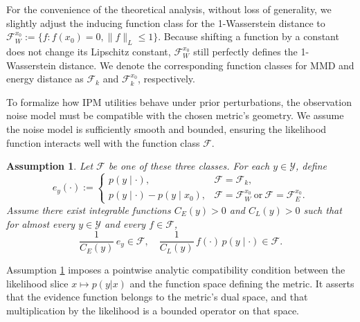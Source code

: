 \documentclass[twoside,11pt]{article}
\def\gF{{\mathcal{F}}}
\newtheorem{assumption}{Assumption}
\begin{document}
For the convenience of the theoretical analysis, without loss of generality, we slightly adjust the inducing function class for the 1-Wasserstein distance to $\gF_W^{x_0}:=\{f:f(x_0)=0, \|f\|_L\leq 1\}$. Because shifting a function by a constant does not change its Lipschitz constant, $\gF_W^{x_0}$ still perfectly defines the 1-Wasserstein distance. We denote the corresponding function classes for MMD and energy distance as $\gF_k$ and $\gF_k^{x_0}$, respectively.

To formalize how IPM utilities behave under prior perturbations, the observation noise model must be compatible with the chosen metric's geometry. We assume the noise model is sufficiently smooth and bounded, ensuring the likelihood function interacts well with the function class $\mathcal{F}$.

\begin{assumption}
\label{asmp:compatibility}
    Let \(\mathcal F\) be one of these three classes. For each \(y\in\mathcal Y\), define
\[
e_y(\cdot):=
\begin{cases}
p(y\mid \cdot), & \mathcal F=\mathcal F_k,\\[0.5ex]
p(y\mid \cdot)-p(y\mid x_0), & \mathcal F=\mathcal F_W^{x_0}\ \text{or}\ \mathcal F=\mathcal F_E^{x_0}.
\end{cases}
\]
Assume there exist integrable functions $C_E(y) > 0$ and $C_L(y) > 0$ such that for almost every \(y\in\mathcal Y\) and every \(f\in\mathcal F\),
\[
\frac{1}{C_E(y)}\,e_y\in\mathcal F, \quad
\frac{1}{C_L(y)}\,f(\cdot)\,p(y\mid\cdot)\in\mathcal F.
\]
\end{assumption}

Assumption \ref{asmp:compatibility} imposes a pointwise analytic compatibility condition between the likelihood slice $x \mapsto p(y | x)$ and the function space defining the metric. It asserts that the evidence function belongs to the metric's dual space, and that multiplication by the likelihood is a bounded operator on that space.
\end{document}
